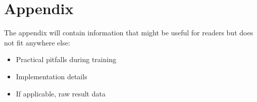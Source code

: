 

\chapter{Appendix}
\label{ch:appendix}
The appendix will contain information that might be useful for readers but 
does not fit anywhere else:
\begin{itemize}
  \item Practical pitfalls during training
  \item Implementation details
  \item If applicable, raw result data
\end{itemize}